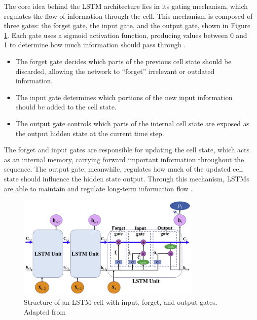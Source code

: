 The core idea behind the LSTM architecture lies in its gating mechanism, which regulates the flow of information through the cell. This mechanism is composed of three gates: the forget gate, the input gate, and the output gate, shown in Figure \ref{fig:LSTM-struct}. Each gate uses a sigmoid activation function, producing values between 0 and 1 to determine how much information should pass through \cite{schmidt2019recurrentneuralnetworksrnns}.

\begin{itemize}
    \item The forget gate decides which parts of the previous cell state should be discarded, allowing the network to “forget” irrelevant or outdated information. 
    \item The input gate determines which portions of the new input information should be added to the cell state.
    \item The output gate controls which parts of the internal cell state are exposed as the output hidden state at the current time step.
\end{itemize}

The forget and input gates are responsible for updating the cell state, which acts as an internal memory, carrying forward important information throughout the sequence. The output gate, meanwhile, regulates how much of the updated cell state should influence the hidden state output. Through this mechanism, LSTMs are able to maintain and regulate long-term information flow \cite{ALSELWI2024102068}.

\begin{figure}[H]
    \centering
    \includegraphics[width=9cm]{Cap2_LitReview/model_basics/LSTM/LSTM_Arch.png}
    \caption{Structure of an LSTM cell with input, forget, and output gates. Adapted from \cite{WEI2021453}}
    \label{fig:LSTM-struct}
\end{figure}


